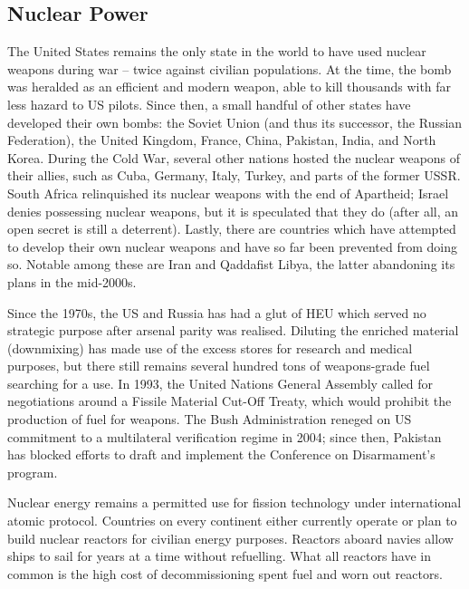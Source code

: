 \documentclass[letterpaper,12pt,twoside]{article} %
\begin{document}
\begin{multicols}{2}

\section{Nuclear Power}

The United States remains the only state in the world to have used nuclear weapons during war -- twice against civilian populations. At the time, the bomb was heralded as an efficient and modern weapon, able to kill thousands with far less hazard to US pilots. Since then, a small handful of other states have developed their own bombs: the Soviet Union (and thus its successor, the Russian Federation), the United Kingdom, France, China, Pakistan, India, and North Korea. During the Cold War, several other nations hosted the nuclear weapons of their allies, such as Cuba, Germany, Italy, Turkey, and parts of the former USSR. South Africa relinquished its nuclear weapons with the end of Apartheid; Israel denies possessing nuclear weapons, but it is speculated that they do (after all, an open secret is still a deterrent).  Lastly, there are countries which have attempted to develop their own nuclear weapons and have so far been prevented from doing so. Notable among these are Iran and Qaddafist Libya, the latter abandoning its plans in the mid-2000s.

Since the 1970s, the US and Russia has had a glut of HEU which served no strategic purpose after arsenal parity was realised. Diluting the enriched material (downmixing) has made use of the excess stores for research and medical purposes, but there still remains several hundred tons of weapons-grade fuel searching for a use. In 1993, the United Nations General Assembly called for negotiations around a Fissile Material Cut-Off Treaty, which would prohibit the production of fuel for weapons. The Bush Administration reneged on US commitment to a multilateral verification regime in 2004; since then, Pakistan has blocked efforts to draft and implement the Conference on Disarmament's program.

Nuclear energy remains a permitted use for fission technology under international atomic protocol. Countries on every continent either currently operate or plan to build nuclear reactors for civilian energy purposes. Reactors aboard navies allow ships to sail for years at a time without refuelling. What all reactors have in common is the high cost of decommissioning spent fuel and worn out reactors.


\end{multicols}
\end{document}
